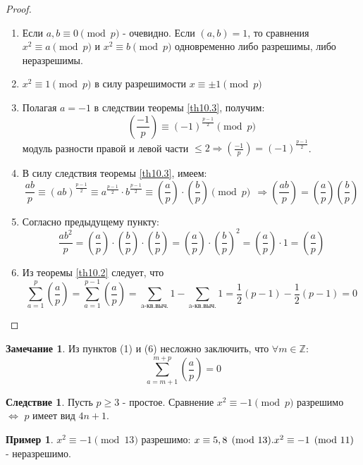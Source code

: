 \documentclass[a4paper, 12pt]{article}
\newcommand{\Z}{\mathbb{Z}}
\newcommand\tab[1][.5cm]{\hspace*{#1}}
\theoremstyle{definition}
\newtheorem*{consequense}{Следствие}
\newtheorem*{comm}{Замечание}
\newtheorem*{example}{Пример}
\begin{document}
        \begin{proof}\tab
            \begin{enumerate}
                \item Если $a,b\equiv 0\pmod{p}$ - очевидно. Если $(a,b)=1$, то сравнения\\
                $x^2\equiv a\pmod{p}$ и $x^2\equiv b\pmod{p}$ одновременно либо разрешимы, либо неразрешимы.
                \item $x^2\equiv 1\pmod{p}$ в силу разрешимости $x\equiv \pm 1\pmod{p}$
                \item Полагая $a=-1$ в следствии теоремы \ref{th10.3}, получим:
                \[(\frac{-1}{p})\equiv (-1)^{\frac{p-1}{2}}\pmod{p}\]
                модуль разности правой и левой части $\leq 2 \Rightarrow (\frac{-1}{p})=(-1)^{\frac{p-1}{2}}$.
                \item В силу следствия теоремы \ref{th10.3}, имеем:
                \[\frac{ab}{p}\equiv(ab)^{\frac{p-1}{2}}\equiv a^{\frac{p-1}{2}}\cdot b^{\frac{p-1}{2}}\equiv (\frac{a}{p})\cdot(\frac{b}{p})\pmod{p}\ \ \Rightarrow (\frac{ab}{p})=(\frac{a}{p})(\frac{b}{p})\]
                \item Согласно предыдущему пункту:
                \[\frac{ab^2}{p}=(\frac{a}{p})\cdot(\frac{b}{p})\cdot(\frac{b}{p})=(\frac{a}{p})\cdot(\frac{b}{p})^2=(\frac{a}{p})\cdot 1=(\frac{a}{p})\]
                \item Из теоремы \ref{th10.2} следует, что
                \[\sum\limits_{a=1}^{p}(\frac{a}{p})=\sum\limits_{a=1}^{p-1}(\frac{a}{p})=\sum\limits_{\text{a-кв.выч.}}1 - \sum\limits_{\text{a-кв.выч.}}1=\frac{1}{2}(p-1)-\frac{1}{2}(p-1)=0\]
            \end{enumerate}
        \end{proof}
    \begin{comm}
        Из пунктов (1) и (6) несложно заключить, что $\forall m\in\Z$:
        \[\sum\limits_{a=m+1}^{m+p}(\frac{a}{p})=0\]
    \end{comm} 
    \begin{consequense}
        Пусть $p\geq 3$ - простое. Сравнение $x^2\equiv -1\pmod{p}$ разрешимо\\
        $\Leftrightarrow$ $p$ имеет вид $4n+1$.
    \end{consequense} 
    \begin{example}
        $x^2\equiv -1\pmod{13}$ разрешимо: $x\equiv 5,8\pmod{13}.\\
        x^2\equiv -1\pmod{11}$ - неразрешимо.
    \end{example}
\end{document}

